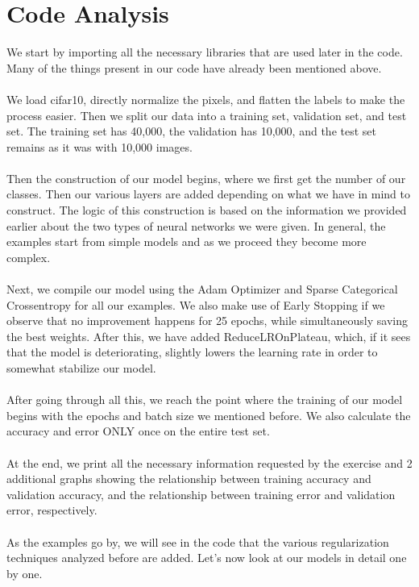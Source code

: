 \documentclass[11pt, letterpaper]{article}
\begin{document}
\newpage

\section*{Code Analysis}
We start by importing all the necessary libraries that are used later in the code. Many of the things present in our code have already been mentioned above. \\ \\
We load cifar10, directly normalize the pixels, and flatten the labels to make the process easier. Then we split our data into a training set, validation set, and test set. The training set has 40,000, the validation has 10,000, and the test set remains as it was with 10,000 images. \\ \\
Then the construction of our model begins, where we first get the number of our classes. Then our various layers are added depending on what we have in mind to construct. The logic of this construction is based on the information we provided earlier about the two types of neural networks we were given. In general, the examples start from simple models and as we proceed they become more complex.\\ \\
Next, we compile our model using the Adam Optimizer and Sparse Categorical Crossentropy for all our examples. We also make use of Early Stopping if we observe that no improvement happens for 25 epochs, while simultaneously saving the best weights. After this, we have added ReduceLROnPlateau, which, if it sees that the model is deteriorating, slightly lowers the learning rate in order to somewhat stabilize our model. \\ \\
After going through all this, we reach the point where the training of our model begins with the epochs and batch size we mentioned before. We also calculate the accuracy and error ONLY once on the entire test set.\\ \\
At the end, we print all the necessary information requested by the exercise and 2 additional graphs showing the relationship between training accuracy and validation accuracy, and the relationship between training error and validation error, respectively. \\ \\ 
As the examples go by, we will see in the code that the various regularization techniques analyzed before are added. Let's now look at our models in detail one by one.
\end{document}

